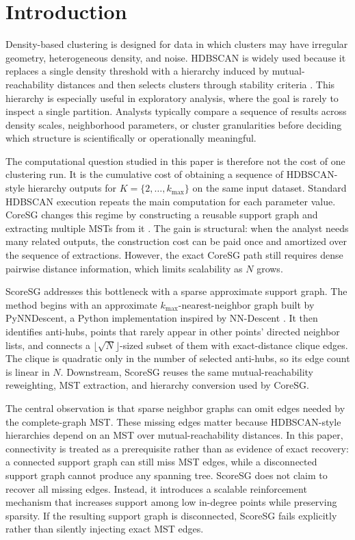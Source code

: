 \documentclass[11pt]{article}
\begin{document}
\section{Introduction}

Density-based clustering is designed for data in which clusters may have irregular geometry, heterogeneous density, and noise. HDBSCAN is widely used because it replaces a single density threshold with a hierarchy induced by mutual-reachability distances and then selects clusters through stability criteria \citep{campello2013density,campello2015hierarchical}. This hierarchy is especially useful in exploratory analysis, where the goal is rarely to inspect a single partition. Analysts typically compare a sequence of results across density scales, neighborhood parameters, or cluster granularities before deciding which structure is scientifically or operationally meaningful.

The computational question studied in this paper is therefore not the cost of one clustering run. It is the cumulative cost of obtaining a sequence of HDBSCAN-style hierarchy outputs for \(K=\{2,\ldots,k_{\max}\}\) on the same input dataset. Standard HDBSCAN execution repeats the main computation for each parameter value. CoreSG changes this regime by constructing a reusable support graph and extracting multiple MSTs from it \citep{araujo2022coresg}. The gain is structural: when the analyst needs many related outputs, the construction cost can be paid once and amortized over the sequence of extractions. However, the exact CoreSG path still requires dense pairwise distance information, which limits scalability as \(N\) grows.

ScoreSG addresses this bottleneck with a sparse approximate support graph. The method begins with an approximate \(k_{\max}\)-nearest-neighbor graph built by PyNNDescent, a Python implementation inspired by NN-Descent \citep{dong2011efficient,pynndescentdocs}. It then identifies anti-hubs, points that rarely appear in other points' directed neighbor lists, and connects a \(\lfloor\sqrt{N}\rfloor\)-sized subset of them with exact-distance clique edges. The clique is quadratic only in the number of selected anti-hubs, so its edge count is linear in \(N\). Downstream, ScoreSG reuses the same mutual-reachability reweighting, MST extraction, and hierarchy conversion used by CoreSG.

The central observation is that sparse neighbor graphs can omit edges needed by the complete-graph MST. These missing edges matter because HDBSCAN-style hierarchies depend on an MST over mutual-reachability distances. In this paper, connectivity is treated as a prerequisite rather than as evidence of exact recovery: a connected support graph can still miss MST edges, while a disconnected support graph cannot produce any spanning tree. ScoreSG does not claim to recover all missing edges. Instead, it introduces a scalable reinforcement mechanism that increases support among low in-degree points while preserving sparsity. If the resulting support graph is disconnected, ScoreSG fails explicitly rather than silently injecting exact MST edges.
\end{document}
